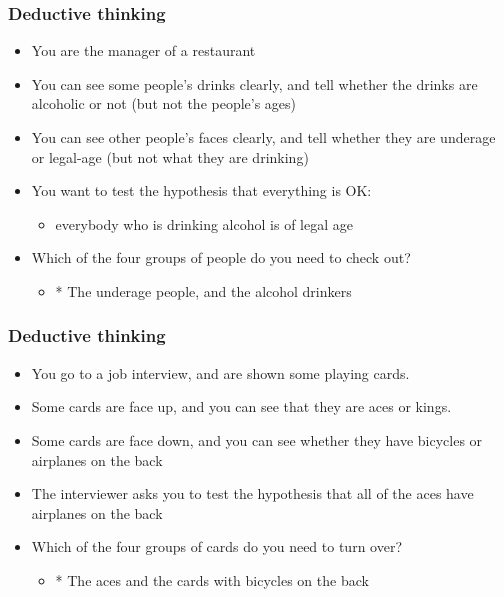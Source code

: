 \documentclass{beamer}
\begin{document}
\begin{frame}


\frametitle{Deductive thinking}\begin{itemize}

\item You are the manager of a restaurant

\item You can see some people's drinks clearly, and tell whether the
	drinks are alcoholic or not (but not the people's ages)

\item You can see other people's faces clearly, and tell whether they are
	underage or legal-age (but not what they are drinking)

\item You want to test the hypothesis that everything is OK:\begin{itemize}

\item everybody who is drinking alcohol is of legal age\end{itemize}

\item Which of the four groups of people do you need to check out?\begin{itemize}

\item * {\color{blue} The underage people, and the alcohol drinkers}\end{itemize}\end{itemize}
\end{frame}

\begin{frame}


\frametitle{Deductive thinking}\begin{itemize}

\item You go to a job interview, and are shown some playing cards.

\item Some cards are face up, and you can see that they are aces or kings.

\item Some cards are face down, and you can see whether they have bicycles
	or airplanes on the back

\item The interviewer asks you to test the hypothesis that all of the aces
	have airplanes on the back

\item Which of the four groups of cards do you need to turn over?\begin{itemize}

\item * {\color{blue} The aces and the cards with bicycles on the back}\end{itemize}\end{itemize}
\end{frame}
\end{document}
